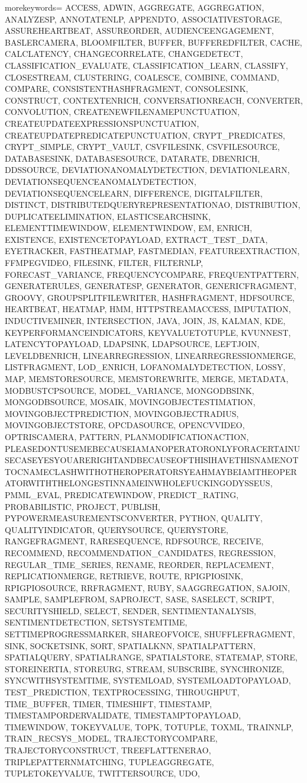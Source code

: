 
%
   {morekeywords={%
ACCESS, ADWIN, AGGREGATE, AGGREGATION, ANALYZESP, ANNOTATENLP, APPENDTO, ASSOCIATIVESTORAGE, ASSUREHEARTBEAT, ASSUREORDER, AUDIENCEENGAGEMENT, BASLERCAMERA, BLOOMFILTER, BUFFER, BUFFEREDFILTER, CACHE, CALCLATENCY, CHANGECORRELATE, CHANGEDETECT, CLASSIFICATION_EVALUATE, CLASSIFICATION_LEARN, CLASSIFY, CLOSESTREAM, CLUSTERING, COALESCE, COMBINE, COMMAND, COMPARE, CONSISTENTHASHFRAGMENT, CONSOLESINK, CONSTRUCT, CONTEXTENRICH, CONVERSATIONREACH, CONVERTER, CONVOLUTION, CREATENEWFILENAMEPUNCTUATION, CREATEUPDATEEXPRESSIONSPUNCTUATION, CREATEUPDATEPREDICATEPUNCTUATION, CRYPT_PREDICATES, CRYPT_SIMPLE, CRYPT_VAULT, CSVFILESINK, CSVFILESOURCE, DATABASESINK, DATABASESOURCE, DATARATE, DBENRICH, DDSSOURCE, DEVIATIONANOMALYDETECTION, DEVIATIONLEARN, DEVIATIONSEQUENCEANOMALYDETECTION, DEVIATIONSEQUENCELEARN, DIFFERENCE, DIGITALFILTER, DISTINCT, DISTRIBUTEDQUERYREPRESENTATIONAO, DISTRIBUTION, DUPLICATEELIMINATION, ELASTICSEARCHSINK, ELEMENTTIMEWINDOW, ELEMENTWINDOW, EM, ENRICH, EXISTENCE, EXISTENCETOPAYLOAD, EXTRACT_TEST_DATA, EYETRACKER, FASTHEATMAP, FASTMEDIAN, FEATUREEXTRACTION, FFMPEGVIDEO, FILESINK, FILTER, FILTERNLP, FORECAST_VARIANCE, FREQUENCYCOMPARE, FREQUENTPATTERN, GENERATERULES, GENERATESP, GENERATOR, GENERICFRAGMENT, GROOVY, GROUPSPLITFILEWRITER, HASHFRAGMENT, HDFSOURCE, HEARTBEAT, HEATMAP, HMM, HTTPSTREAMACCESS, IMPUTATION, INDUCTIVEMINER, INTERSECTION, JAVA, JOIN, JS, KALMAN, KDE, KEYPERFORMANCEINDICATORS, KEYVALUETOTUPLE, KVUNNEST, LATENCYTOPAYLOAD, LDAPSINK, LDAPSOURCE, LEFTJOIN, LEVELDBENRICH, LINEARREGRESSION, LINEARREGRESSIONMERGE, LISTFRAGMENT, LOD_ENRICH, LOFANOMALYDETECTION, LOSSY, MAP, MEMSTORESOURCE, MEMSTOREWRITE, MERGE, METADATA, MODBUSTCPSOURCE, MODEL_VARIANCE, MONGODBSINK, MONGODBSOURCE, MOSAIK, MOVINGOBJECTESTIMATION, MOVINGOBJECTPREDICTION, MOVINGOBJECTRADIUS, MOVINGOBJECTSTORE, OPCDASOURCE, OPENCVVIDEO, OPTRISCAMERA, PATTERN, PLANMODIFICATIONACTION, PLEASEDONTUSEMEBECAUSEIAMANOPERATORONLYFORACERTAINUSECASEYESYOUARERIGHTANDBECAUSEOFTHISIHAVETHISNAMENOTTOCNAMECLASHWITHOTHEROPERATORSYEAHMAYBEIAMTHEOPERATORWITHTHELONGESTINNAMEINWHOLEFUCKINGODYSSEUS, PMML_EVAL, PREDICATEWINDOW, PREDICT_RATING, PROBABILISTIC, PROJECT, PUBLISH, PYPOWERMEASUREMENTSCONVERTER, PYTHON, QUALITY, QUALITYINDICATOR, QUERYSOURCE, QUERYSTORE, RANGEFRAGMENT, RARESEQUENCE, RDFSOURCE, RECEIVE, RECOMMEND, RECOMMENDATION_CANDIDATES, REGRESSION, REGULAR_TIME_SERIES, RENAME, REORDER, REPLACEMENT, REPLICATIONMERGE, RETRIEVE, ROUTE, RPIGPIOSINK, RPIGPIOSOURCE, RRFRAGMENT, RUBY, SAAGGREGATION, SAJOIN, SAMPLE, SAMPLEFROM, SAPROJECT, SASE, SASELECT, SCRIPT, SECURITYSHIELD, SELECT, SENDER, SENTIMENTANALYSIS, SENTIMENTDETECTION, SETSYSTEMTIME, SETTIMEPROGRESSMARKER, SHAREOFVOICE, SHUFFLEFRAGMENT, SINK, SOCKETSINK, SORT, SPATIALKNN, SPATIALPATTERN, SPATIALQUERY, SPATIALRANGE, SPATIALSTORE, STATEMAP, STORE, STOREINERTIA, STOREURG, STREAM, SUBSCRIBE, SYNCHRONIZE, SYNCWITHSYSTEMTIME, SYSTEMLOAD, SYSTEMLOADTOPAYLOAD, TEST_PREDICTION, TEXTPROCESSING, THROUGHPUT, TIME_BUFFER, TIMER, TIMESHIFT, TIMESTAMP, TIMESTAMPORDERVALIDATE, TIMESTAMPTOPAYLOAD, TIMEWINDOW, TOKEYVALUE, TOPK, TOTUPLE, TOXML, TRAINNLP, TRAIN_RECSYS_MODEL, TRAJECTORYCOMPARE, TRAJECTORYCONSTRUCT, TREEFLATTENERAO, TRIPLEPATTERNMATCHING, TUPLEAGGREGATE, TUPLETOKEYVALUE, TWITTERSOURCE, UDO, }}
